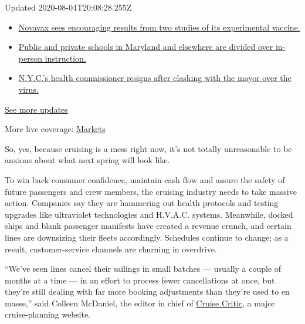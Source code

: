 Updated 2020-08-04T20:08:28.255Z

\begin{itemize}
\tightlist
\item
  \href{https://www.nytimes.com/2020/08/04/world/coronavirus-cases.html?action=click\&pgtype=Article\&state=default\&region=MAIN_CONTENT_1\&context=storylines_live_updates\#link-1228a480}{Novavax
  sees encouraging results from two studies of its experimental
  vaccine.}
\item
  \href{https://www.nytimes.com/2020/08/04/world/coronavirus-cases.html?action=click\&pgtype=Article\&state=default\&region=MAIN_CONTENT_1\&context=storylines_live_updates\#link-4825b93}{Public
  and private schools in Maryland and elsewhere are divided over
  in-person instruction.}
\item
  \href{https://www.nytimes.com/2020/08/04/world/coronavirus-cases.html?action=click\&pgtype=Article\&state=default\&region=MAIN_CONTENT_1\&context=storylines_live_updates\#link-4d1eafa8}{N.Y.C.'s
  health commissioner resigns after clashing with the mayor over the
  virus.}
\end{itemize}

\href{https://www.nytimes.com/2020/08/04/world/coronavirus-cases.html?action=click\&pgtype=Article\&state=default\&region=MAIN_CONTENT_1\&context=storylines_live_updates}{See
more updates}

More live coverage:
\href{https://www.nytimes.com/live/2020/08/04/business/stock-market-today-coronavirus?action=click\&pgtype=Article\&state=default\&region=MAIN_CONTENT_1\&context=storylines_live_updates}{Markets}

So, yes, because cruising is a mess right now, it's not totally
unreasonable to be anxious about what next spring will look like.

To win back consumer confidence, maintain cash flow and assure the
safety of future passengers and crew members, the cruising industry
needs to take massive action. Companies say they are hammering out
health protocols and testing upgrades like ultraviolet technologies and
H.V.A.C. systems. Meanwhile, docked ships and blank passenger manifests
have created a revenue crunch, and certain lines are downsizing their
fleets accordingly. Schedules continue to change; as a result,
customer-service channels are churning in overdrive.

``We've seen lines cancel their sailings in small batches --- usually a
couple of months at a time --- in an effort to process fewer
cancellations at once, but they're still dealing with far more booking
adjustments than they're used to en masse,'' said Colleen McDaniel, the
editor in chief of \href{https://www.cruisecritic.com/}{Cruise Critic},
a major cruise-planning website.

